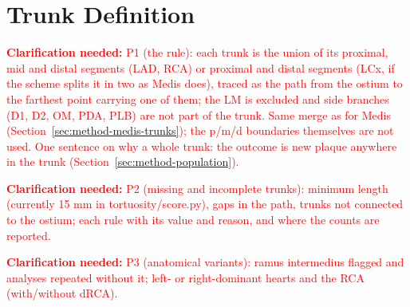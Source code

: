 \providecommand{\clarify}[1]{\textcolor{red}{\textbf{Clarification needed:} #1}}
\section{Trunk Definition}
\label{sec:method-trunk}

\clarify{P1 (the rule): each trunk is the union of its proximal, mid and distal segments (LAD, RCA) or proximal and distal segments (LCx, if the scheme splits it in two as Medis does), traced as the path from the ostium to the farthest point carrying one of them; the LM is excluded and side branches (D1, D2, OM, PDA, PLB) are not part of the trunk. Same merge as for Medis (Section~\ref{sec:method-medis-trunks}); the p/m/d boundaries themselves are not used. One sentence on why a whole trunk: the outcome is new plaque anywhere in the trunk (Section~\ref{sec:method-population}).}

\clarify{P2 (missing and incomplete trunks): minimum length (currently 15 mm in tortuosity/score.py), gaps in the path, trunks not connected to the ostium; each rule with its value and reason, and where the counts are reported.}

\clarify{P3 (anatomical variants): ramus intermedius flagged and analyses repeated without it; left- or right-dominant hearts and the RCA (with/without dRCA).}
